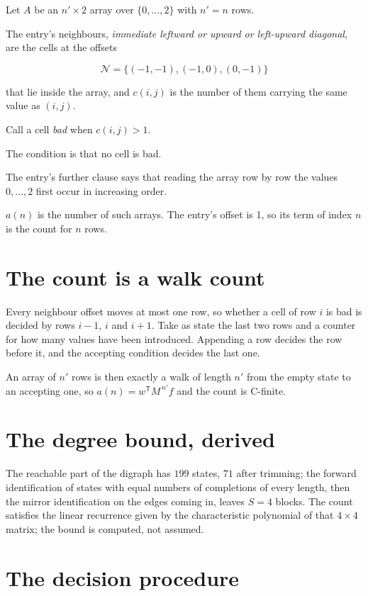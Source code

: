\documentclass[11pt]{article}
\theoremstyle{definition}
\begin{document}
Let $A$ be an $n' \times 2$ array over $\{0,\dots,2\}$ with $n' = n$ rows.

The entry's neighbours, {\itshape immediate leftward or upward or left-upward diagonal}, are the cells at the offsets

\[\mathcal{N} = \{(-1,-1), (-1,0), (0,-1)\}\]

that lie inside the array, and $c(i,j)$ is the number of them carrying the same value as $(i,j)$.

Call a cell {\itshape bad} when $c(i,j) > 1$.

The condition is that no cell is bad.

The entry's further clause says that reading the array row by row the values $0,\dots,2$ first occur in increasing order.

$a(n)$ is the number of such arrays. The entry's offset is 1, so its term of index $n$ is the count for $n$ rows.

\section{The count is a walk count}

Every neighbour offset moves at most one row, so whether a cell of row $i$ is bad is decided by rows $i-1$, $i$ and $i+1$. Take as state the last two rows and a counter for how many values have been introduced. Appending a row decides the row before it, and the accepting condition decides the last one.

An array of $n'$ rows is then exactly a walk of length $n'$ from the empty state to an accepting one, so $a(n) = w^{\mathsf T}M^{\,n'}f$ and the count is C-finite.

\section{The degree bound, derived}

The reachable part of the digraph has $199$ states, $71$ after trimming; the forward identification of states with equal numbers of completions of every length, then the mirror identification on the edges coming in, leaves $S = 4$ blocks. The count satisfies the linear recurrence given by the characteristic polynomial of that $4\times4$ matrix; the bound is computed, not assumed.

\section{The decision procedure}
\end{document}
